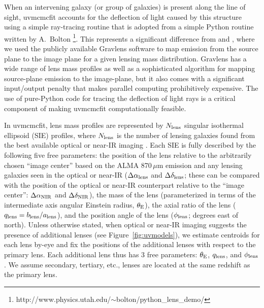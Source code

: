 \documentclass[iop]{emulateapj}
\begin{document}
When an intervening galaxy (or group of galaxies) is present along the line of
sight, {\sc uvmcmcfit} accounts for the deflection of light caused by this
structure using a simple ray-tracing routine that is adopted from a simple
Python routine written by A.~Bolton
\footnote{http://www.physics.utah.edu/$\sim$bolton/python\_lens\_demo/}.  This
represents a significant difference from \citet{Bussmann:2012lr} and
\citet{Bussmann:2013lr}, where we used the publicly available {\sc Gravlens}
software \citep{Keeton:2001lr} to map emission from the source plane to
the image plane for a given lensing mass distribution.  {\sc Gravlens} has a
wide range of lens mass profiles as well as a sophisticated algorithm for
mapping source-plane emission to the image-plane, but it also comes with a
significant input/output penalty that makes parallel computing prohibitively
expensive.  The use of pure-Python code for tracing the deflection of light
rays is a critical component of making {\sc uvmcmcfit} computationally
feasible.

In {\sc uvmcmcfit}, lens mass profiles are represented by $N_{\rm lens}$
singular isothermal ellipsoid (SIE) profiles, where $N_{\rm lens}$ is the
number of lensing galaxies found from the best available optical or near-IR
imaging \citep[a multitude of evidence supports the SIE as a reasonable choice;
for a recent review, see][]{Treu:2010fk}.  Each SIE is fully described by the
following five free parameters: the position of the lens relative to the
arbitrarily chosen ``image center'' based on the ALMA 870$\,\mu$m emission and
any lensing galaxies seen in the optical or near-IR ($\Delta \alpha_{\rm lens}$
and $\Delta \delta_{\rm lens}$; these can be compared with the position of the
optical or near-IR counterpart relative to the ``image center'': $\Delta
\alpha_{\rm NIR}$ and $\Delta \delta_{\rm NIR}$), the mass of the lens
(parameterized in terms of the intermediate axis angular Einstein radius,
$\theta_{\rm E}$), the axial ratio of the lens ($q_{\rm lens} = b_{\rm lens} /
a_{\rm lens}$), and the position angle of the lens ($\phi_{\rm lens}$; degrees
east of north).  Unless otherwise stated, when optical or near-IR imaging
suggests the presence of additional lenses (see Figure~\ref{fig:uvmodels}), we
estimate centroids for each lens by-eye and fix the positions of the additional
lenses with respect to the primary lens.  Each additional lens thus has 3 free
parameters: $\theta_{\rm E}$, $q_{\rm lens}$, and $\phi_{\rm lens}$.  We assume
secondary, tertiary, etc., lenses are located at the same redshift as the
primary lens.  
\end{document}
